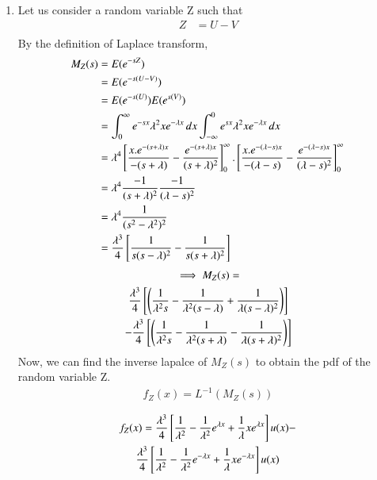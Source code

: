 \documentclass[journal,12pt,twocolumn]{IEEEtran}
\theoremstyle{remark}
\begin{document}
\begin{enumerate}
\item Let us consider a random variable Z such that 
\begin{align}
Z &= U-V\\
\end{align}
By the definition of Laplace transform,
\begin{align}
M_{Z}(s) &= E(e^{-sZ})\\
  &= E(e^{-s(U-V)})\\
  &= E(e^{-s(U)})E(e^{s(V)})\\
  &= \int_{0}^{\infty} e^{-sx}\lambda^{2}xe^{-\lambda x} \, dx \int_{-\infty}^{0} e^{sx}\lambda^{2}xe^{-\lambda x} \, dx \\
  &= \lambda^4\sbrak{\frac{x.e^{-(s+\lambda)x}}{-(s+\lambda)}-\frac{e^{-(s+\lambda)x}}{(s+\lambda)^2}}_0^{\infty}.\sbrak{\frac{x.e^{-(\lambda-s)x}}{-(\lambda-s)}-\frac{e^{-(\lambda-s)x}}{(\lambda-s)^2}}_0^{\infty}\\
  &= \lambda^4 \frac{-1}{(s+\lambda)^2} \frac{-1}{(\lambda-s)^2}\\ %
  &= \lambda^4 \frac{1}{(s^2-\lambda^2)^2}\\
  &= \frac{\lambda^3}{4 }\sbrak{\frac{1}{s(s-\lambda)^2}-\frac{1}{s(s+\lambda)^2}}\\
\end{align}
\begin{multline}
\implies M_{Z}(s) = \\\frac{\lambda^3}{4 }{}\left[\left(\frac{1}{\lambda^2 s}-\frac{1}{\lambda^2 (s-\lambda)}+\frac{1}{\lambda(s-\lambda)^2}\right)\right]\\- \frac{\lambda^3}{4 }{}\left[\left(\frac{1}{\lambda^2 s}-\frac{1}{\lambda^2 (s+\lambda)}-\frac{1}{\lambda(s+\lambda)^2}\right)\right]
\end{multline}
Now, we can find the inverse lapalce of $M_Z (s)$ to obtain the pdf of the random variable Z.
\begin{align}
f_Z(x) = L^{-1}(M_Z(s))\\
\end{align}
\begin{multline}
f_Z(x) = \frac{\lambda^3}{4}{}\left[\frac{1}{\lambda^2}-\frac{1}{\lambda^2}e^{\lambda x}+\frac{1}{\lambda} xe^{\lambda x}\right]u(x) - \\\frac{\lambda^3}{4}{}\left[\frac{1}{\lambda^2}-\frac{1}{\lambda^2}e^{-\lambda x}+\frac{1}{\lambda} xe^{-\lambda x}\right]u(x)
\end{multline}
\begin{align}

\end{align}
\end{enumerate}
\end{document}
